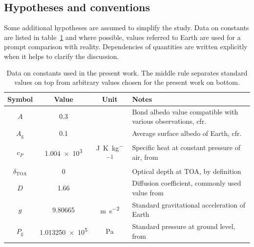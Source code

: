 \documentclass[a4paper,10pt,twocolumn,\classoptions]{article}
\newcommand{\deltaTOA}{\delta_\text{TOA}}
\begin{document}
\subsection{Hypotheses and conventions}
\label{sec:Hypotheses and conventions}
Some additional hypotheses are assumed to simplify the study. Data on constants are listed in table~\ref{tab:constants} and where possible, values referred to Earth are used for a prompt comparison with reality. Dependencies of quantities are written explicitly when it helps to clarify the discussion.
\begin{table}[h]
  \centering
  \caption{Data on constants used in the present work. The middle rule separates standard values on top from arbitrary values chosen for the present work on bottom.}
  \label{tab:constants}
  \begin{tabular}[b]{cccp{}}
    \toprule
    Symbol             & Value                  & Unit                                  & \centering Notes                                                   \tabularnewline
    \midrule
    $A$                & \num{0.3}              &                                       & Bond albedo value compatible with various observations, cfr. \cite[1281]{albedo}   \\
    $A_\text{g}$           & \num{0.1}              &                                       & Average surface albedo of Earth, cfr. \cite[217]{primer}   \\
    $c_P$ & \num{1.004e3}          & \unit{\joule\per\kelvin\per\kilogram} & Specific heat at constant pressure of air, from \cite[16]{Catling} \\
    $\deltaTOA$            & \num{0}            &                         & Optical depth at TOA, by definition                                             \\
    $D$       & \num{1.66}            &                       & Diffusion coefficient, commonly used value from \cite[55]{Catling}                                             \\
    $g$                & \num{9.80665}          & \unit{\metre\per\square\second}       & Standard gravitational acceleration of Earth                       \\
    $P_\text{g}$       & \num{1.013250e5}       & \unit{\pascal}                        & Standard pressure at ground level, from \cite[2]{US1976}           \\

\end{tabular}
\end{table}
\end{document}
